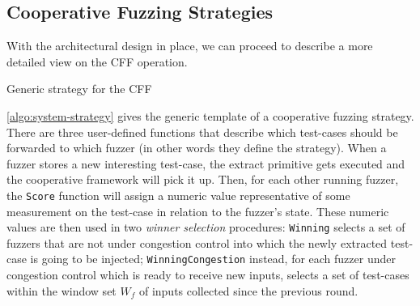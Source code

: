 \subsection{Cooperative Fuzzing Strategies}
\label{sec:system-design-strats}
With the architectural design in place, we can proceed to describe a more
detailed view on the \ac{CFF} operation.

\begin{algorithm}
    \DontPrintSemicolon
    \BlankLine
\caption{Generic strategy for the \acl{CFF}}
\label{algo:system-strategy}
\end{algorithm}

\autoref{algo:system-strategy} gives the generic template of a cooperative
fuzzing strategy. There are three user-defined functions that describe which
test-cases should be forwarded to which fuzzer (in other words they define the
strategy). When a fuzzer stores a new interesting test-case, the extract
primitive gets executed and the cooperative framework will pick it up. Then, for
each other running fuzzer, the \texttt{Score} function will assign a numeric
value representative of some measurement on the test-case in relation to the
fuzzer's state. These numeric values are then used in two \emph{winner
selection} procedures: \texttt{Winning} selects a set of fuzzers that are not
under congestion control into which the newly extracted test-case is going to be
injected; \texttt{WinningCongestion} instead, for each fuzzer under congestion
control which is ready to receive new inputs, selects a set of test-cases within
the window set $W_f$ of inputs collected since the previous round.

